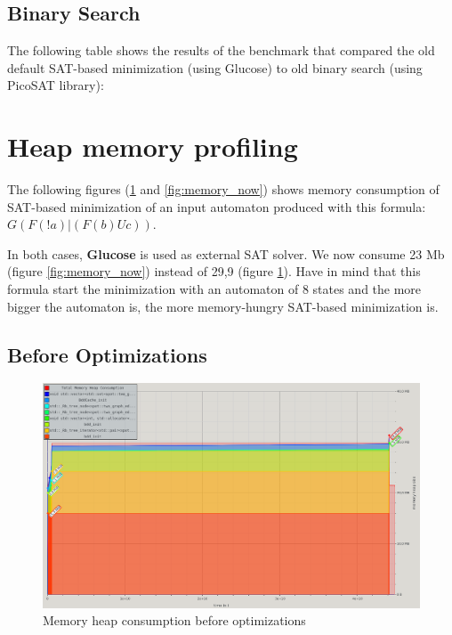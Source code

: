 \begin{landscape}
\subsection{Binary Search}
\label{glu_vs_dicho_complete}
The following table shows the results of the benchmark that compared the old default SAT-based minimization
(using Glucose) to old binary search (using PicoSAT library):\\

\section{Heap memory profiling}
\label{memory_profiling}

The following figures (\ref{fig:memory_before} and \ref{fig:memory_now}) shows memory consumption
of SAT-based minimization of an input automaton produced with this formula: $G(F(!a) | (F(b) U c))$.

In both cases, \textbf{Glucose} is used as external SAT solver. We now consume 23 Mb
(figure \ref{fig:memory_now}) instead of 29,9 (figure \ref{fig:memory_before}). Have in mind that
this formula start the minimization with an automaton of 8 states and the more bigger the automaton is, the
more memory-hungry SAT-based minimization is.

\subsection{Before Optimizations}

\begin{figure}[H]
 \centering
 \includegraphics[scale=0.6]{img/memory_before.png}
 \caption{Memory heap consumption before optimizations}
 \label{fig:memory_before}
\end{figure}


\end{landscape}
